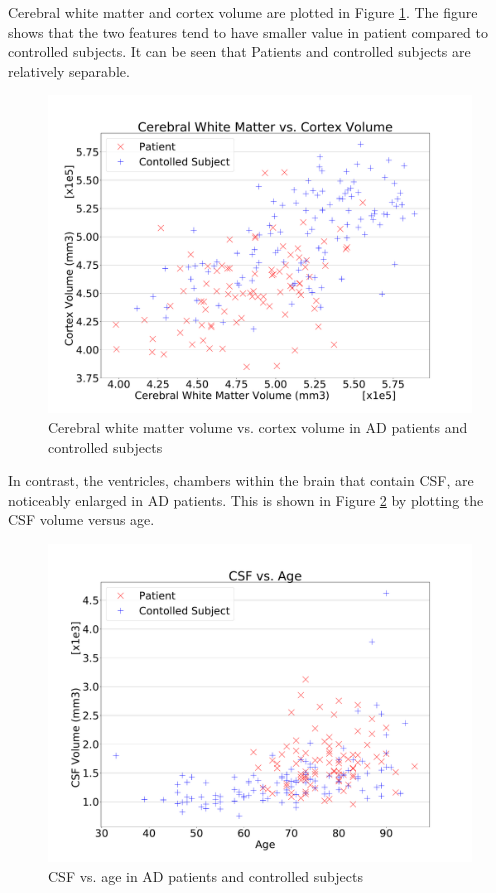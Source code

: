 Cerebral white matter and cortex volume are plotted in Figure
\ref{fig:AD-Age-CortexVol-WhiteMatter}. The figure shows that the two features tend to have smaller value in patient compared to controlled subjects. It can be seen that Patients and controlled subjects are relatively separable.


\begin{figure}
	\centering
	\includegraphics[width=\columnwidth]{images/AD-CWMVolCortexVol.pdf}
	\caption{Cerebral white matter volume vs. cortex volume in AD patients and controlled subjects}
	\label{fig:AD-Age-CortexVol-WhiteMatter}
\end{figure}

In contrast, the ventricles, chambers within the brain that contain CSF, are noticeably enlarged in AD patients. This is shown in Figure \ref{fig:AD-Age-CSF.pdf} by plotting the CSF volume versus age.  

\begin{figure}
	\centering
	\includegraphics[width=\columnwidth]{images/AD-Age-CSF.pdf}
	\caption{CSF vs. age in AD patients and controlled subjects}
	\label{fig:AD-Age-CSF.pdf}
\end{figure}


